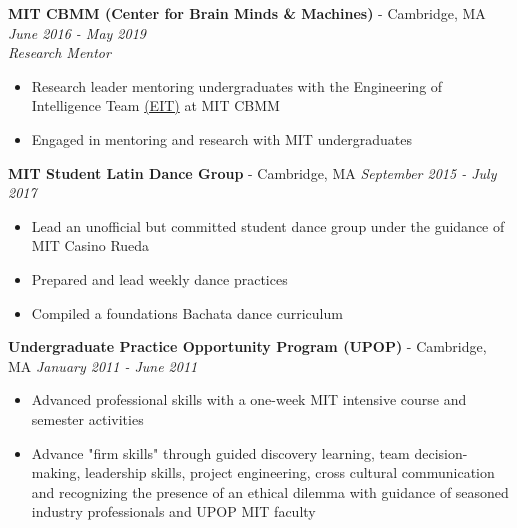 \documentclass{article}
\newenvironment{changemargin}[2]{%
  \begin{list}{}{%
    \setlength{\topsep}{0pt}%
    \setlength{\leftmargin}{#1}%
    \setlength{\rightmargin}{#2}%
    \setlength{\listparindent}{\parindent}%
    \setlength{\itemindent}{\parindent}%
    \setlength{\parsep}{\parskip}%
  }%
  \item[]}{\end{list}
}
\newenvironment{body} {
	\vspace*{-16pt}
	\begin{changemargin}{-0.25in}{-0.5in}
  }	
	{\end{changemargin}
}
\begin{document}
\begin{body}
	\textbf{MIT CBMM (Center for Brain Minds \& Machines)} - Cambridge, MA \hfill \emph{June 2016 - May 2019}\\
	\emph{Research Mentor}\\
	\vspace*{-3pt}
	\begin{itemize} \itemsep -2pt  %
    	\item Research leader mentoring undergraduates with the Engineering of Intelligence Team \href{https://cbmm.mit.edu/eit/people}{(EIT)} at MIT CBMM
        \item Engaged in mentoring and research with MIT undergraduates
	\end{itemize}
	\vspace{5 pt}
	
	\textbf{MIT Student Latin Dance Group} - Cambridge, MA \hfill \emph{September 2015 - July 2017}\\
	\vspace*{-3pt}
	\begin{itemize} \itemsep -2pt
		\item Lead an unofficial but committed student dance group under the guidance of MIT Casino Rueda
        \item Prepared and lead weekly dance practices
        \item Compiled a foundations Bachata dance curriculum
	\end{itemize}
	\vspace{5 pt}
	
	\textbf{Undergraduate Practice Opportunity Program (UPOP)} - Cambridge, MA \hfill \emph{January 2011 - June 2011}\\
	\vspace*{-3pt}
	\begin{itemize} \itemsep -2pt
		\item Advanced professional skills with a one-week MIT intensive course and semester activities
        \item Advance "firm skills" through guided discovery learning, team decision-making, leadership skills, project engineering, cross cultural communication and recognizing the presence of an ethical dilemma with guidance of seasoned industry professionals and UPOP MIT faculty
	\end{itemize}
	\vspace{5 pt}

	\vspace{5pt}

\end{body}
\end{document}
